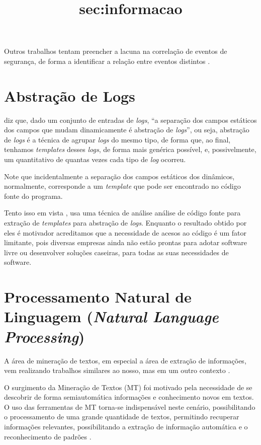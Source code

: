 \documentclass[
	12pt,				%
	openright,			%
	twoside,			%
	a4paper,			%
	english,			%
	spanish,			%
	brazil,				%
	]{abntex2}
\begin{document}
Outros trabalhos tentam preencher a lacuna na correlação de eventos de segurança, de forma a identificar a relação entre eventos distintos \cite{smith2008using, stroeh2013approach}.

\section{Abstração de Logs}\title{sec:informacao}
\cite{nagappan2010abstracting} diz que, dado um conjunto de entradas de \emph{logs}, ``a separação dos campos estáticos dos campos que mudam dinamicamente é abstração de \emph{logs}'', ou seja, abstração de \emph{logs} é a técnica de agrupar \emph{logs} do mesmo tipo, de forma que, ao final, tenhamos \emph{templates} desses \emph{logs}, de forma mais genérica possível, e, possivelmente, um quantitativo de quantas vezes cada tipo de \emph{log} ocorreu.

Note que incidentalmente a separação dos campos estáticos dos dinâmicos, normalmente, corresponde a um \emph{template} que pode ser encontrado no código fonte do programa. 

Tento isso em vista \cite{xu2009detecting}, usa uma técnica de análise análise de código fonte para extração de \emph{templates} para abstração de \emph{logs}. Enquanto o resultado obtido por eles é motivador acreditamos que a necessidade de acesos ao código é um fator limitante, pois diversas empresas ainda não estão prontas para adotar software livre ou desenvolver soluções caseiras, para todas as suas necessidades de software.

\section{Processamento Natural de Linguagem (\emph{Natural Language Processing})}
A área de mineração de textos, em especial a área de extração de informações, vem realizando trabalhos similares ao nosso, mas em um outro contexto \cite{duque2012processo, matos2010environment}.

O surgimento da Mineração de Textos (MT) foi motivado pela necessidade de se descobrir de forma semiautomática informações e conhecimento novos em textos. O uso das ferramentas de MT torna-se indispensável neste cenário, possibilitando o processamento de uma grande quantidade de textos, permitindo recuperar informações relevantes, possibilitando a extração de informação automática e o reconhecimento de padrões \cite{duque2012processo}.
\end{document}

